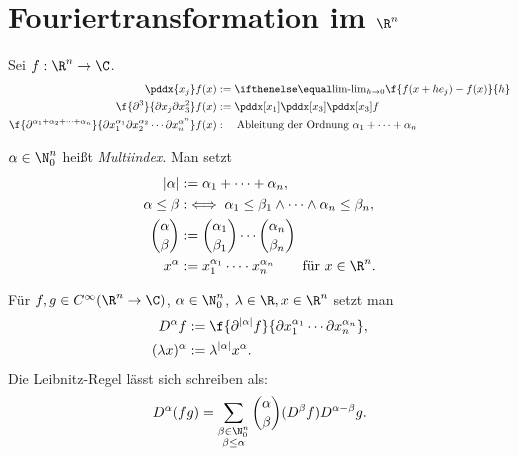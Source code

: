 \section{Fouriertransformation im \texorpdfstring{$\R^n$}{R\textasciicircum n}}


\begin{nt*}[Erinnerung]
	Sei $f : \R^n \to \C$.
	\begin{align*}
		\pddx{x_j} f(x) &:= \lim_{h\to 0} \f {f(x+he_j)-f(x)}{h} \\
		\f{\partial^3 }{\partial x_j \partial x_3^2}f(x) &:= \pddx[x_1] \pddx[x_3] \pddx[x_3] f \\
		\f{\partial^{\alpha_1 + \alpha_2 + \dotsb + \alpha_n} }{\partial x_1^{\alpha_1} \partial x_2^{\alpha_2} \dotsb \partial x_n^{\alpha^n}}f(x)  &: \quad \text{Ableitung der Ordnung $\alpha_1 + \dotsb + \alpha_n$}
	\end{align*}
\end{nt*}

\begin{df} \label{4.27}
	$\alpha \in \N_0^n$ heißt \emph{Multiindex}.
	Man setzt
	\begin{align*}
		|\alpha| &:= \alpha_1 + \dotsb + \alpha_n, \\
		\alpha \le \beta &:\iff \alpha_1 \le \beta_1 \land \dotsb \land \alpha_n \le \beta_n, \\
		\binom{\alpha}{\beta} &:= \binom{\alpha_1}{\beta_1}  \dotsb \binom{\alpha_n}{\beta_n} \\
		x^\alpha &:= x_1^{\alpha_1}  \dotsb \cdot x_n^{\alpha_n} \qquad \text{für $x\in \R^n$.}
	\end{align*}
\end{df}

\begin{ex}[Anwendung] \label{4.28}
	Für $f, g \in C^\infty (\R^n \to \C)$, $\alpha \in \N_0^n$, $\lambda \in \R, x \in \R^n$ setzt man
	\begin{align*}
		D^\alpha f &:= \f {\partial^{|\alpha|}f}{\partial x_1^{\alpha_1} \dotsb \partial x_n^{\alpha_n}},\\
		(\lambda x)^\alpha &:= \lambda^{|\alpha|} x^\alpha.
	\end{align*}
	Die Leibnitz-Regel lässt sich schreiben als:
	\[
		D^\alpha(f g) = \sum_{\substack{\beta \in \N_0^n \\ \beta \le \alpha}} \binom{\alpha}{\beta} (D^\beta f)D^{\alpha - \beta} g.
	\]
\end{ex}


